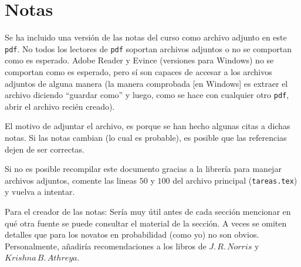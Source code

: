 \documentclass[a5paper,oneside]{amsart}
\theoremstyle{definition}
\numberwithin{section}{part}
\numberwithin{equation}{subsection}
\begin{document}
        
        
    \part*{Notas}\label{notas}
        Se ha incluido una versión de las notas del curso como archivo adjunto en este \texttt{pdf}. No todos los lectores de \texttt{pdf} soportan 
        archivos adjuntos o no se comportan como es esperado. Adobe Reader y Evince (versiones para Windows) no se comportan como es esperado, 
        pero sí son capaces de accesar a los archivos adjuntos de alguna manera (la manera comprobada [en Windows] es extraer el archivo diciendo 
        ``guardar como'' y luego, como se hace con cualquier otro \texttt{pdf}, abrir el archivo recién creado).\pn
        
        El motivo de adjuntar el archivo, es porque se han hecho algunas citas a dichas notas. Si las notas cambian (lo cual es probable), 
        es posible que las referencias dejen de ser correctas.\pn
        
        Si no es posible recompilar este documento gracias a la librería para manejar archivos adjuntos, comente las lineas $50$ y $100$ del archivo 
        principal (\texttt{tareas.tex}) y vuelva a intentar.\pn
        
        Para el creador de las notas: Sería muy útil antes de cada sección mencionar en qué otra fuente se puede consultar el material de
        la sección. A veces se omiten detalles que para los novatos en probabilidad (como yo) no son obvios. Personalmente, añadiría recomendaciones 
        a los libros de $J.\,R.\,Norris$ y $Krishna\,B.\,Athreya$.
\end{document}
